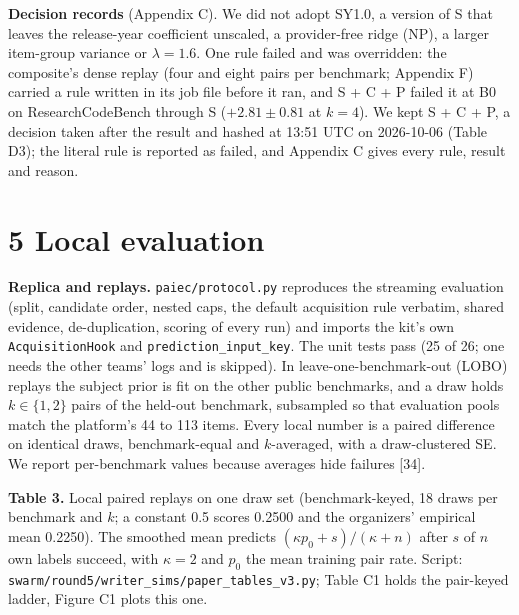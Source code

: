 \documentclass[
]{article}
\begin{document}
\textbf{Decision records} (Appendix C). We did not adopt SY1.0, a
version of S that leaves the release-year coefficient unscaled, a
provider-free ridge (NP), a larger item-group variance or
\(\lambda = 1.6\). One rule failed and was overridden: the composite's
dense replay (four and eight pairs per benchmark; Appendix F) carried a
rule written in its job file before it ran, and S + C + P failed it at
B0 on ResearchCodeBench through S (\(+2.81 \pm 0.81\) at \(k = 4\)). We
kept S + C + P, a decision taken after the result and hashed at 13:51
UTC on 2026-10-06 (Table D3); the literal rule is reported as failed,
and Appendix C gives every rule, result and reason.

\section{5 Local evaluation}\label{local-evaluation}

\textbf{Replica and replays.} \texttt{paiec/protocol.py} reproduces the
streaming evaluation (split, candidate order, nested caps, the default
acquisition rule verbatim, shared evidence, de-duplication, scoring of
every run) and imports the kit's own \texttt{AcquisitionHook} and
\texttt{prediction\_input\_key}. The unit tests pass (25 of 26; one
needs the other teams' logs and is skipped). In leave-one-benchmark-out
(LOBO) replays the subject prior is fit on the other public benchmarks,
and a draw holds \(k \in \{1, 2\}\) pairs of the held-out benchmark,
subsampled so that evaluation pools match the platform's 44 to 113
items. Every local number is a paired difference on identical draws,
benchmark-equal and \(k\)-averaged, with a draw-clustered SE. We report
per-benchmark values because averages hide failures {[}34{]}.

\textbf{Table 3.} Local paired replays on one draw set (benchmark-keyed,
18 draws per benchmark and \(k\); a constant 0.5 scores 0.2500 and the
organizers' empirical mean 0.2250). The smoothed mean predicts
\((\kappa p_0 + s)/(\kappa + n)\) after \(s\) of \(n\) own labels
succeed, with \(\kappa = 2\) and \(p_0\) the mean training pair rate.
Script: \texttt{swarm/round5/writer\_sims/paper\_tables\_v3.py}; Table
C1 holds the pair-keyed ladder, Figure C1 plots this one.
\end{document}
